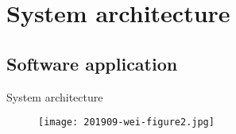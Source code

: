 

\section{System architecture}

\subsection{Software application}

\begin{frame}{System architecture}
	\begin{figure}[h]
        \centering
        \texttt{[image: 201909-wei-figure2.jpg]}
      \end{figure}
\end{frame}



